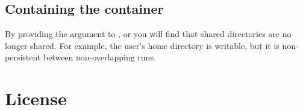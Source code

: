 \documentclass[letterpaper,10pt,english]{sphinxmanual}
\begin{document}
\subsection{Containing the container}
\label{\detokenize{installation_environments:containing-the-container}}
By providing the argument  to ,  or  you will find that shared directories
are no longer shared. For example, the user’s home directory is
writable, but it is non-persistent between non-overlapping runs.


\section{License}
\label{\detokenize{installation_environments:license}}
%
\end{document}
